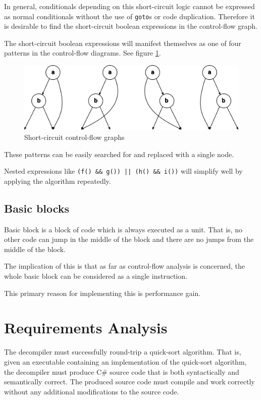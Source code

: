 \documentclass[12pt,twoside,notitlepage]{report}
\begin{document}
In general, conditionals depending on this short-circuit logic
cannot be expressed as normal conditionals without the use of \verb|goto|s
or code duplication.
Therefore it is desirable to find the short-circuit boolean expressions
in the control-flow graph.

The short-circuit boolean expressions will manifest themselves as
one of four patterns in the control-flow diagrams.
See figure \ref{shortcircuit}.

\begin{figure}[tbh]
\centerline{\includegraphics{figs/shortcircuit.png}}
\caption{\label{shortcircuit}Short-circuit control-flow graphs}
\end{figure}

These patterns can be easily searched for and replaced with a single node.

Nested expressions like \verb/(f() && g()) || (h() && i())/
will simplify well by applying the algorithm repeatedly.

\subsection{Basic blocks}

Basic block is a block of code which is always executed as
a unit.  That is, no other code can jump in the middle of the 
block and there are no jumps from the middle of the block.

The implication of this is that as far as control-flow
analysis is concerned, the whole basic block can be 
considered as a single instruction.

This primary reason for implementing this is performance gain.


\section{Requirements Analysis}

The decompiler must successfully round-trip a quick-sort algorithm. 
That is, given an executable containing an implementation of
the quick-sort algorithm, the decompiler must produce
C\# source code that is both syntactically and semantically correct.
The produced source code must compile and work correctly
without any additional modifications to the source code.
\end{document}
